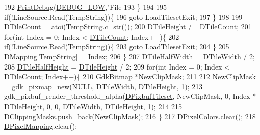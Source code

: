 \begin{DoxyCode}
{192         \hyperlink{Debug_8h_aa5f00f5537c9760f6ae1782460748ab9}{PrintDebug}(\hyperlink{Debug_8h_a3a5f3fc09784650d8388cb854882f840}{DEBUG\_LOW},\textcolor{stringliteral}{"File %
193     \}
194 
195     \textcolor{keywordflow}{if}(!LineSource.Read(TempString))\{
196         \textcolor{keywordflow}{goto} LoadTilesetExit;
197     \}
198 
199     \hyperlink{classCGraphicTileset_a39d942b370e47f441bf97385eb1037c8}{DTileCount} = atoi(TempString.c\_str());
200     \hyperlink{classCGraphicTileset_af48f32e07d5fe69afd5f764318cc3244}{DTileHeight} /= \hyperlink{classCGraphicTileset_a39d942b370e47f441bf97385eb1037c8}{DTileCount};
201     \textcolor{keywordflow}{for}(\textcolor{keywordtype}{int} Index = 0; Index < \hyperlink{classCGraphicTileset_a39d942b370e47f441bf97385eb1037c8}{DTileCount}; Index++)\{
202         \textcolor{keywordflow}{if}(!LineSource.Read(TempString))\{
203             \textcolor{keywordflow}{goto} LoadTilesetExit;
204         \}
205         \hyperlink{classCGraphicTileset_a17cd13f68f77ea4976b59b37b10e914b}{DMapping}[TempString] = Index;
206     \}
207     \hyperlink{classCGraphicTileset_a3e82808009078ce29f6b74bcd077b251}{DTileHalfWidth} = \hyperlink{classCGraphicTileset_a2d0c7d19865b81911a3a43d5cae50e00}{DTileWidth} / 2;
208     \hyperlink{classCGraphicTileset_a16c8bc4e4c8738fe561b0408cd40ccef}{DTileHalfHeight} = \hyperlink{classCGraphicTileset_af48f32e07d5fe69afd5f764318cc3244}{DTileHeight} / 2;
209     \textcolor{keywordflow}{for}(\textcolor{keywordtype}{int} Index = 0; Index < \hyperlink{classCGraphicTileset_a39d942b370e47f441bf97385eb1037c8}{DTileCount}; Index++)\{
210         GdkBitmap *NewClipMask;
211     
212         NewClipMask = gdk\_pixmap\_new(NULL, \hyperlink{classCGraphicTileset_a2d0c7d19865b81911a3a43d5cae50e00}{DTileWidth}, \hyperlink{classCGraphicTileset_af48f32e07d5fe69afd5f764318cc3244}{DTileHeight}, 1);
213         gdk\_pixbuf\_render\_threshold\_alpha(\hyperlink{classCGraphicTileset_a5d5adfcdbb347a6df3f57535ca08e3ef}{DPixbufTileset}, NewClipMask, 0, Index * 
      \hyperlink{classCGraphicTileset_af48f32e07d5fe69afd5f764318cc3244}{DTileHeight}, 0, 0, \hyperlink{classCGraphicTileset_a2d0c7d19865b81911a3a43d5cae50e00}{DTileWidth}, DTileHeight, 1);
214         
215         \hyperlink{classCGraphicTileset_a3761aec1b9a8bf189da5a7202d7fcac9}{DClippingMasks}.push\_back(NewClipMask);
216     \}
217     \hyperlink{classCGraphicTileset_a4e9672b8b133dbac600fb8bb400d1cb3}{DPixelColors}.clear();
218     \hyperlink{classCGraphicTileset_a650c021d8ea1724a4c9564600df0da05}{DPixelMapping}.clear();
}}
\end{DoxyCode}
